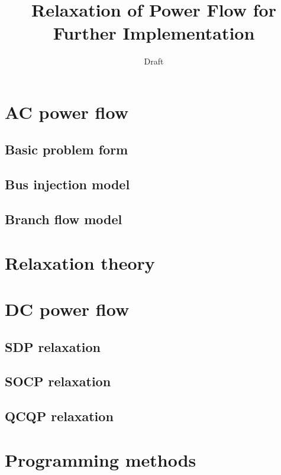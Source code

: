 \documentclass{article}
\title{Relaxation of Power Flow for Further Implementation}
\author{
  Draft \\
}
\begin{document}
\maketitle

\begin{abstract}


\end{abstract}


\section{AC power flow}
\subsection{Basic problem form}

\subsection{Bus injection model}

\subsection{Branch flow model}

\section{Relaxation theory}
\section{DC power flow}

\subsection{SDP relaxation}

\subsection{SOCP relaxation}

\subsection{QCQP relaxation}

\section{Programming methods} 
\end{document}
